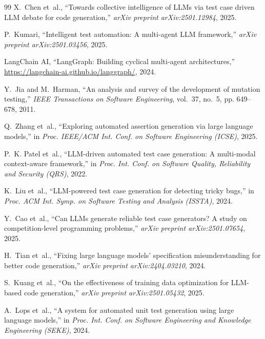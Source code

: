 \documentclass[conference]{IEEEtran}
\begin{document}
\begin{thebibliography}{99}
X.~Chen et~al., ``Towards collective intelligence of LLMs via test case driven LLM debate for code generation,'' \emph{arXiv preprint arXiv:2501.12984}, 2025.

P.~Kumari, ``Intelligent test automation: A multi-agent LLM framework,'' \emph{arXiv preprint arXiv:2501.03456}, 2025.

LangChain AI, ``LangGraph: Building cyclical multi-agent architectures,'' \url{https://langchain-ai.github.io/langgraph/}, 2024.

Y.~Jia and M.~Harman, ``An analysis and survey of the development of mutation testing,'' \emph{IEEE Transactions on Software Engineering}, vol.~37, no.~5, pp. 649--678, 2011.

Q.~Zhang et~al., ``Exploring automated assertion generation via large language models,'' in \emph{Proc. IEEE/ACM Int. Conf. on Software Engineering (ICSE)}, 2025.

P.~K. Patel et~al., ``LLM-driven automated test case generation: A multi-modal context-aware framework,'' in \emph{Proc. Int. Conf. on Software Quality, Reliability and Security (QRS)}, 2022.

K.~Liu et~al., ``LLM-powered test case generation for detecting tricky bugs,'' in \emph{Proc. ACM Int. Symp. on Software Testing and Analysis (ISSTA)}, 2024.

Y.~Cao et~al., ``Can LLMs generate reliable test case generators? A study on competition-level programming problems,'' \emph{arXiv preprint arXiv:2501.07654}, 2025.

H.~Tian et~al., ``Fixing large language models' specification misunderstanding for better code generation,'' \emph{arXiv preprint arXiv:2404.03210}, 2024.

S.~Kuang et~al., ``On the effectiveness of training data optimization for LLM-based code generation,'' \emph{arXiv preprint arXiv:2501.05432}, 2025.

A.~Lops et~al., ``A system for automated unit test generation using large language models,'' in \emph{Proc. Int. Conf. on Software Engineering and Knowledge Engineering (SEKE)}, 2024.

\end{thebibliography}
\end{document}
